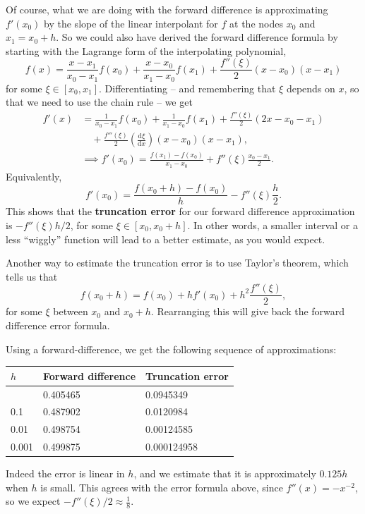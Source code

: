 \documentclass[
  letterpaper,
  DIV=11,
  numbers=noendperiod]{scrreprt}
\newenvironment{fbxSimple}[3]{\begin{tcolorbox}[enhanced, breakable,%
attach boxed title to top*={xshift=1.4pt},
boxed title style={boxrule=0.0mm, fuzzy shadow={1pt}{-1pt}{0mm}{0.1mm}{gray}, arc=.3em, rounded corners=east, sharp corners=west}, colframe=#1-color2, colbacktitle=#1-color1, colback = white, coltitle=black,  titlerule=0mm, toprule=0pt, bottomrule=.7pt, leftrule=.3em, rightrule=.7pt, outer arc=.3em,  	left=.5em, right=.5em, bottomtitle=1mm, toptitle=1mm,title=\textbf{#2}\hspace{0.5em}{#3}]}
{\end{tcolorbox}}
\begin{document}
Of course, what we are doing with the forward difference is
approximating \(f'(x_0)\) by the slope of the linear interpolant for
\(f\) at the nodes \(x_0\) and \(x_1=x_0 + h\). So we could also have
derived the forward difference formula by starting with the Lagrange
form of the interpolating polynomial, \[
f(x) = \frac{x-x_1}{x_0-x_1}f(x_0) + \frac{x-x_0}{x_1-x_0}f(x_1) + \frac{f''(\xi)}{2}(x-x_0)(x-x_1)
\] for some \(\xi\in[x_0,x_1]\). Differentiating -- and remembering that
\(\xi\) depends on \(x\), so that we need to use the chain rule -- we
get \[
\begin{aligned}
f'(x) &= \frac{1}{x_0-x_1}f(x_0) + \frac{1}{x_1-x_0}f(x_1) + \frac{f''(\xi)}{2}(2x - x_0 - x_1) \\
&\quad + \frac{f'''(\xi)}{2}\left(\frac{\mathrm{d}\xi}{\mathrm{d}x}\right)(x-x_0)(x-x_1),\\
&\implies f'(x_0) = \frac{f(x_1) - f(x_0)}{x_1-x_0} + f''(\xi)\frac{x_0-x_1}{2}.
\end{aligned}
\] Equivalently, \[
f'(x_0) = \frac{f(x_0+h)-f(x_0)}{h} - f''(\xi)\frac{h}{2}.
\] This shows that the \textbf{truncation error} for our forward
difference approximation is \(-f''(\xi)h/2\), for some
\(\xi\in[x_0,x_0+h]\). In other words, a smaller interval or a less
``wiggly'' function will lead to a better estimate, as you would expect.

Another way to estimate the truncation error is to use Taylor's theorem,
which tells us that \[
f(x_0+h) = f(x_0) + h f'(x_0) + h^2\frac{f''(\xi)}{2},
\] for some \(\xi\) between \(x_0\) and \(x_0+h\). Rearranging this will
give back the forward difference error formula.

\label{derivative-of-fxlogx-at-x_02.}
\begin{fbxSimple}{eg}{Example 4.1: }{Derivative of \(f(x)=\log(x)\) at \(x_0=2\).}
\label{derivative-of-fxlogx-at-x_02.}
Using a forward-difference, we get the following sequence of
approximations:

\begin{longtable}[]{@{}lll@{}}
\toprule\noalign{}
\(h\) & Forward difference & Truncation error \\
\midrule\noalign{}
\endhead
\bottomrule\noalign{}
\endlastfoot
1 & 0.405465 & 0.0945349 \\
0.1 & 0.487902 & 0.0120984 \\
0.01 & 0.498754 & 0.00124585 \\
0.001 & 0.499875 & 0.000124958 \\
\end{longtable}

Indeed the error is linear in \(h\), and we estimate that it is
approximately \(0.125 h\) when \(h\) is small. This agrees with the
error formula above, since \(f''(x) = -x^{-2}\), so we expect
\(-f''(\xi)/2\approx \tfrac18\).

\end{fbxSimple}
\end{document}
